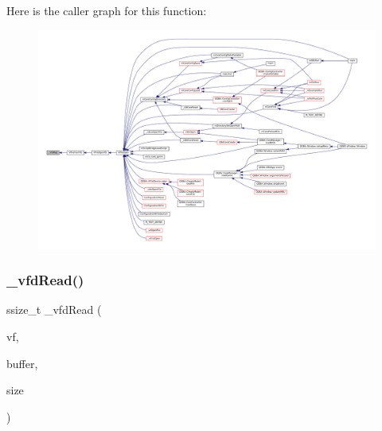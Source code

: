 Here is the caller graph for this function\+:
\nopagebreak
\begin{figure}[H]
\begin{center}
\leavevmode
\includegraphics[width=350pt]{vfs-fd_8c_a12d1697e3d7ebc27c66cb2bfb5d8b025_icgraph}
\end{center}
\end{figure}
\mbox{\label{vfs-fd_8c_a4d32fae21137dfbf535bcc4a0212d862}} 
\subsubsection{\texorpdfstring{\+\_\+vfd\+Read()}{\_vfdRead()}}
{\footnotesize\ttfamily ssize\+\_\+t \+\_\+vfd\+Read (\begin{DoxyParamCaption}\item[{struct V\+File $\ast$}]{vf,  }\item[{void $\ast$}]{buffer,  }\item[{size\+\_\+t}]{size }\end{DoxyParamCaption})\hspace{0.3cm}{\ttfamily [static]}}

